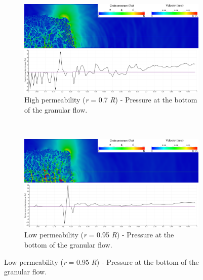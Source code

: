\begin{figure}
\centering
\begin{subfigure}[t]{0.975\textwidth}
	\centering
    \includegraphics[width=\textwidth]{a08/r07_PWP_ini_dense}
    \caption{High permeability (\textit{r} = 0.7 \textit{R}) - Pressure at the 
        bottom of the granular flow.}
    \label{fig:r07_PWP_ini_dense}
\end{subfigure} \\
\begin{subfigure}[t]{0.975\textwidth}
	\centering
    \includegraphics[width=\textwidth]{a08/r095_PWP_ini_dense}
    \caption{Low permeability (\textit{r} = 0.95 \textit{R}) - Pressure at the 
        bottom of the granular flow.}
    \label{fig:r095_PWP_ini_dense}
\end{subfigure}
\end{figure}
